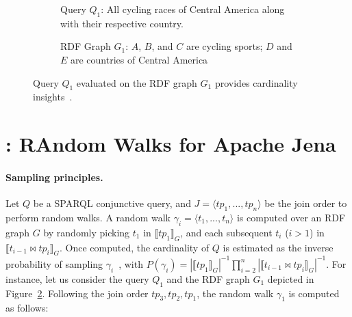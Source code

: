 
\begin{figure}
  \setlength{\fboxsep}{0pt} %
  \begin{subfigure}{0.48\textwidth}
    \caption{\label{fig:q1-j2-1hop}Query $Q_1$: All cycling races of Central America along
      with their respective country.}
  \end{subfigure}
  \hfill
  \begin{subfigure}{0.48\textwidth}
    \fbox{%
      \resizebox{\textwidth}{!}{%
        
    }}
    \caption{RDF Graph $G_1$: $A$, $B$, and $C$ are cycling sports; $D$ and $E$
      are countries of Central America~\cite{10.1007/978-3-031-33455-9_3}}
  \end{subfigure}
  \caption{\label{fig:random_walks_example}Query $Q_1$ evaluated on
    the RDF graph $G_1$ provides cardinality insights~\cite{10.1007/978-3-031-33455-9_3}.}
\end{figure}

\section{\NAME: RAndom Walks for Apache Jena}
\label{sec:proposal}


\paragraph{Sampling principles.}

Let $Q$ be a SPARQL conjunctive query, and $J = \langle tp_1, ..., tp_n \rangle$ be
the join order to perform random walks. A random walk
$\gamma_i = \langle t_1, ..., t_n\rangle$ is computed over
an RDF graph $G$ by randomly picking $t_1$ in $\llbracket tp_1 \rrbracket_G$,
and each subsequent $t_i$ ($i > 1$) in $\llbracket t_{i-1} \bowtie tp_i \rrbracket_G$.
Once computed, the cardinality of $Q$ is estimated as  the inverse probability
of sampling $\gamma_i$~\cite{li2019wanderjoin}, with $P(\gamma_i) = |\llbracket tp_1 \rrbracket_G|^{-1} \prod_{i=2}^{n}
|\llbracket t_{i-1} \bowtie tp_i \rrbracket_G|^{-1}$.
%
For instance, let us consider the query $Q_1$ and the RDF graph $G_1$
depicted in Figure~\ref{fig:random_walks_example}. Following the join
order $tp_3,tp_2,tp_1$, the random walk $\gamma_1$ is computed as
follows:

